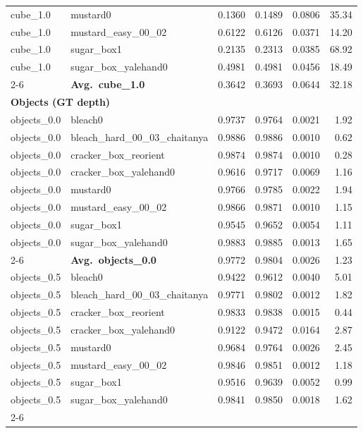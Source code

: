 \begin{longtable}{llrrrr}
  cube_1.0 & mustard0 & 0.1360 & 0.1489 & 0.0806 & 35.34 \\
  cube_1.0 & mustard\_easy\_00\_02 & 0.6122 & 0.6126 & 0.0371 & 14.20 \\
  cube_1.0 & sugar\_box1 & 0.2135 & 0.2313 & 0.0385 & 68.92 \\
  cube_1.0 & sugar\_box\_yalehand0 & 0.4981 & 0.4981 & 0.0456 & 18.49 \\
  \cmidrule{2-6}
  & \textbf{Avg.~cube_1.0} & 0.3642 & 0.3693 & 0.0644 & 32.18 \\
  \midrule
\multicolumn{6}{l}{\textbf{Objects (GT depth)}} \\
\midrule
  objects_0.0 & bleach0 & 0.9737 & 0.9764 & 0.0021 & 1.92 \\
  objects_0.0 & bleach\_hard\_00\_03\_chaitanya & 0.9886 & 0.9886 & 0.0010 & 0.62 \\
  objects_0.0 & cracker\_box\_reorient & 0.9874 & 0.9874 & 0.0010 & 0.28 \\
  objects_0.0 & cracker\_box\_yalehand0 & 0.9616 & 0.9717 & 0.0069 & 1.16 \\
  objects_0.0 & mustard0 & 0.9766 & 0.9785 & 0.0022 & 1.94 \\
  objects_0.0 & mustard\_easy\_00\_02 & 0.9866 & 0.9871 & 0.0010 & 1.15 \\
  objects_0.0 & sugar\_box1 & 0.9545 & 0.9652 & 0.0054 & 1.11 \\
  objects_0.0 & sugar\_box\_yalehand0 & 0.9883 & 0.9885 & 0.0013 & 1.65 \\
  \cmidrule{2-6}
  & \textbf{Avg.~objects_0.0} & 0.9772 & 0.9804 & 0.0026 & 1.23 \\
  \midrule
  objects_0.5 & bleach0 & 0.9422 & 0.9612 & 0.0040 & 5.01 \\
  objects_0.5 & bleach\_hard\_00\_03\_chaitanya & 0.9771 & 0.9802 & 0.0012 & 1.82 \\
  objects_0.5 & cracker\_box\_reorient & 0.9833 & 0.9838 & 0.0015 & 0.44 \\
  objects_0.5 & cracker\_box\_yalehand0 & 0.9122 & 0.9472 & 0.0164 & 2.87 \\
  objects_0.5 & mustard0 & 0.9684 & 0.9764 & 0.0026 & 2.45 \\
  objects_0.5 & mustard\_easy\_00\_02 & 0.9846 & 0.9851 & 0.0012 & 1.18 \\
  objects_0.5 & sugar\_box1 & 0.9516 & 0.9639 & 0.0052 & 0.99 \\
  objects_0.5 & sugar\_box\_yalehand0 & 0.9841 & 0.9850 & 0.0018 & 1.62 \\
  \cmidrule{2-6}

\end{longtable}
